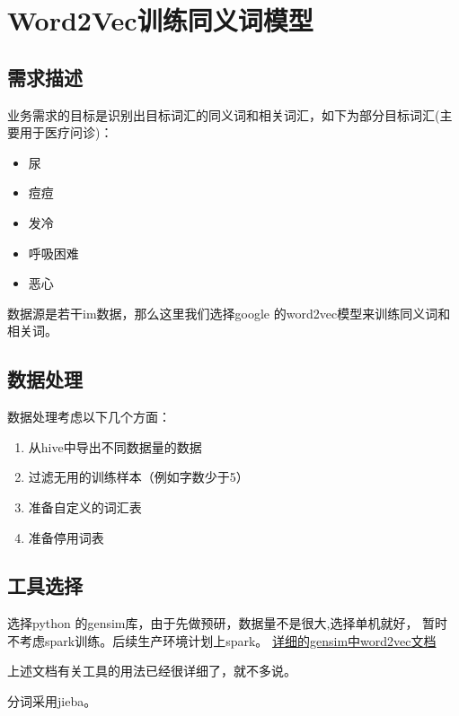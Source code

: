 \chapter{Word2Vec训练同义词模型}
\section{需求描述}
业务需求的目标是识别出目标词汇的同义词和相关词汇，如下为部分目标词汇(主要用于医疗问诊)：
\begin{itemize}
    \item 尿
    \item 痘痘
    \item 发冷
    \item 呼吸困难 
    \item 恶心
\end{itemize}

数据源是若干im数据，那么这里我们选择google 的word2vec模型来训练同义词和相关词。

\section{数据处理}

数据处理考虑以下几个方面：
\begin{enumerate}
    \item 从hive中导出不同数据量的数据
    \item 过滤无用的训练样本（例如字数少于5）
    \item 准备自定义的词汇表
    \item 准备停用词表
\end{enumerate}

\section{工具选择}

选择python 的gensim库，由于先做预研，数据量不是很大,选择单机就好，
暂时不考虑spark训练。后续生产环境计划上spark。
\href{https://radimrehurek.com/gensim/models/word2vec.html}{详细的gensim中word2vec文档}

上述文档有关工具的用法已经很详细了，就不多说。

分词采用jieba。

